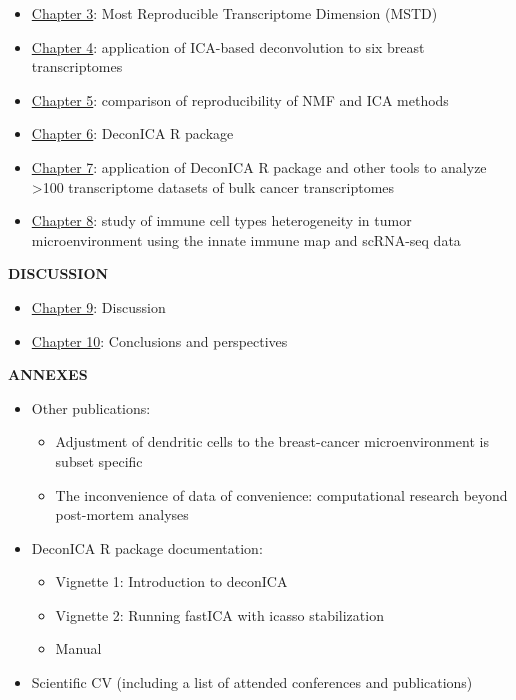 \documentclass[12pt,]{book}
\providecommand{\tightlist}{%
  \setlength{\itemsep}{0pt}\setlength{\parskip}{0pt}}
\theoremstyle{definition}
\theoremstyle{definition}
\theoremstyle{definition}
\theoremstyle{remark}
\begin{document}
\begin{itemize}
\tightlist
\item
  \protect\hyperlink{mstd}{Chapter 3}: Most Reproducible Transcriptome
  Dimension (MSTD)
\item
  \href{}{Chapter 4}: application of ICA-based deconvolution to six
  breast transcriptomes
\item
  \protect\hyperlink{sens}{Chapter 5}: comparison of reproducibility of
  NMF and ICA methods
\item
  \href{}{Chapter 6}: DeconICA R package
\item
  \href{}{Chapter 7}: application of DeconICA R package and other tools
  to analyze \textgreater{}100 transcriptome datasets of bulk cancer
  transcriptomes
\item
  \protect\hyperlink{map}{Chapter 8}: study of immune cell types
  heterogeneity in tumor microenvironment using the innate immune map
  and scRNA-seq data
\end{itemize}

\textbf{DISCUSSION}

\begin{itemize}
\tightlist
\item
  \protect\hyperlink{discussiongenerale}{Chapter 9}: Discussion
\item
  \protect\hyperlink{conclusions}{Chapter 10}: Conclusions and
  perspectives
\end{itemize}

\textbf{ANNEXES}

\begin{itemize}
\tightlist
\item
  Other publications:

  \begin{itemize}
  \tightlist
  \item
    Adjustment of dendritic cells to the breast-cancer microenvironment
    is subset specific
  \item
    The inconvenience of data of convenience: computational research
    beyond post-mortem analyses
  \end{itemize}
\item
  DeconICA R package documentation:

  \begin{itemize}
  \tightlist
  \item
    Vignette 1: Introduction to deconICA
  \item
    Vignette 2: Running fastICA with icasso stabilization
  \item
    Manual
  \end{itemize}
\item
  Scientific CV (including a list of attended conferences and
  publications)
\end{itemize}
\end{document}
